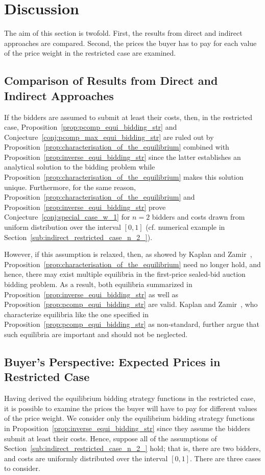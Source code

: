 \section{Discussion} %
\label{sec:discussion}
The aim of this section is twofold. First, the results from direct and indirect approaches are compared. Second, the prices the buyer has to pay for each value of the price weight in the restricted case are examined.

\subsection{Comparison of Results from Direct and Indirect Approaches} %
\label{sub:comparison_of_results_from_direct_and_indirect_approaches}
If the bidders are assumed to submit at least their costs, then, in the restricted case, Proposition~\ref{prop:pcomp_equi_bidding_str} and Conjecture~\ref{conj:pcomp_max_equi_bidding_str} are ruled out by Proposition~\ref{prop:characterisation_of_the_equilibrium} combined with Proposition~\ref{prop:inverse_equi_bidding_str} since the latter establishes an analytical solution to the bidding problem while Proposition~\ref{prop:characterisation_of_the_equilibrium} makes this solution unique. Furthermore, for the same reason, Proposition~\ref{prop:characterisation_of_the_equilibrium} and Proposition~\ref{prop:inverse_equi_bidding_str} prove Conjecture~\ref{conj:special_case_w_1} for $n=2$ bidders and costs drawn from uniform distribution over the interval $[0,1]$ (cf. numerical example in Section~\ref{sub:indirect_restricted_case_n_2_}).

However, if this assumption is relaxed, then, as showed by Kaplan and Zamir~\cite{KaplanZamir2011}, Proposition~\ref{prop:characterisation_of_the_equilibrium} need no longer hold, and hence, there may exist multiple equilibria in the first-price sealed-bid auction bidding problem. As a result, both equilibria summarized in Proposition~\ref{prop:inverse_equi_bidding_str} as well as Proposition~\ref{prop:pcomp_equi_bidding_str} are valid. Kaplan and Zamir~\cite{KaplanZamir2011}, who characterize equilibria like the one specified in Proposition~\ref{prop:pcomp_equi_bidding_str} as non-standard, further argue that such equilibria are important and should not be neglected.

\subsection{Buyer's Perspective: Expected Prices in Restricted Case} %
\label{sub:buyer_s_perspective_expected_prices_in_restricted_case}
Having derived the equilibrium bidding strategy functions in the restricted case, it is possible to examine the prices the buyer will have to pay for different values of the price weight. We consider only the equilibrium bidding strategy functions in Proposition~\ref{prop:inverse_equi_bidding_str} since they assume the bidders submit at least their costs. Hence, suppose all of the assumptions of Section~\ref{sub:indirect_restricted_case_n_2_} hold; that is, there are two bidders, and costs are uniformly distributed over the interval $[0,1]$. There are three cases to consider.

